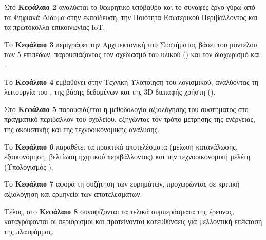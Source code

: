 Στο \textbf{Κεφάλαιο 2} αναλύεται το θεωρητικό υπόβαθρο και το συναφές έργο γύρω από τα Ψηφιακά Δίδυμα στην εκπαίδευση, την Ποιότητα Εσωτερικού Περιβάλλοντος και τα πρωτόκολλα επικοινωνίας IoT.

Το \textbf{Κεφάλαιο 3} περιγράφει την Αρχιτεκτονική του Συστήματος βάσει του μοντέλου των 5 επιπέδων, παρουσιάζοντας τον σχεδιασμό του υλικού () και τον διαχωρισμό  και .

Το \textbf{Κεφάλαιο 4} εμβαθύνει στην Τεχνική Υλοποίηση του λογισμικού, αναλύοντας τη λειτουργία του , της βάσης δεδομένων και της 3D διεπαφής χρήστη ().

Στο \textbf{Κεφάλαιο 5} παρουσιάζεται η μεθοδολογία αξιολόγησης του συστήματος στο πραγματικό περιβάλλον του σχολείου, εξηγώντας τον τρόπο μέτρησης της ενέργειας, της ακουστικής και της τεχνοοικονομικής ανάλυσης.

Το \textbf{Κεφάλαιο 6} παραθέτει τα πρακτικά αποτελέσματα (μείωση κατανάλωσης, εξοικονόμηση, βελτίωση ηχητικού περιβάλλοντος) και την τεχνοοικονομική μελέτη (Υπολογισμός ).

Το \textbf{Κεφάλαιο 7} αφορά τη συζήτηση των ευρημάτων, προχωρώντας σε κριτική αξιολόγηση και ερμηνεία των αποτελεσμάτων.

Τέλος, στο \textbf{Κεφάλαιο 8} συνοψίζονται τα τελικά συμπεράσματα της έρευνας, καταγράφονται οι περιορισμοί και προτείνονται κατευθύνσεις για μελλοντική επέκταση της πλατφόρμας.





